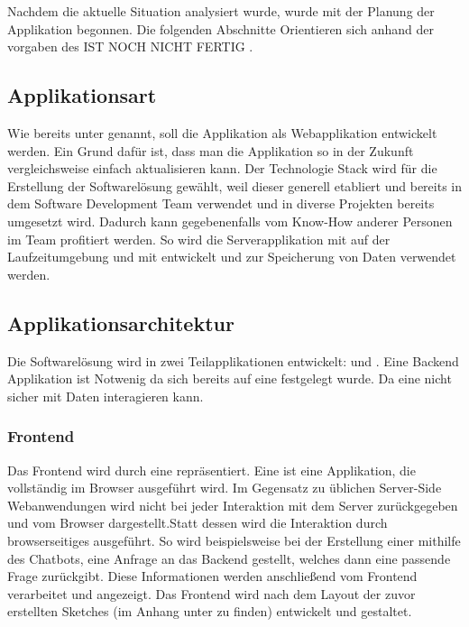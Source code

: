 Nachdem die aktuelle Situation analysiert wurde, wurde mit der Planung der Applikation begonnen. Die folgenden Abschnitte Orientieren sich anhand der vorgaben des \todo IST NOCH NICHT FERTIG .

\subsection{Applikationsart}

Wie bereits unter  genannt, soll die Applikation als Webapplikation entwickelt werden. Ein Grund dafür ist, dass man die Applikation so in der Zukunft
vergleichsweise einfach aktualisieren kann. Der Technologie Stack  wird für die Erstellung der Softwarelösung gewählt, weil dieser generell etabliert und bereits in dem Software Development Team verwendet und in diverse Projekten bereits umgesetzt wird. Dadurch kann gegebenenfalls vom Know-How anderer Personen im Team profitiert werden. So wird die Serverapplikation mit  auf der Laufzeitumgebung  und  mit  entwickelt und  zur Speicherung von Daten verwendet werden.

\subsection{Applikationsarchitektur}
\label{sec:Planungsphase:Applikationsarchitektur}

Die Softwarelösung wird in zwei Teilapplikationen entwickelt:  und . Eine Backend Applikation ist Notwenig da sich bereits auf eine  festgelegt wurde. Da eine  nicht sicher mit Daten interagieren kann.

\subsubsection{Frontend}
\label{sec:Planungsphase:Frontend}

Das Frontend wird durch eine  repräsentiert. Eine  ist eine Applikation, die vollständig im Browser ausgeführt wird.  Im Gegensatz zu üblichen Server-Side Webanwendungen wird nicht bei jeder Interaktion mit dem Server  zurückgegeben und vom Browser dargestellt.Statt dessen wird die Interaktion durch browserseitiges  ausgeführt. 
So wird beispielsweise bei der Erstellung einer  mithilfe des Chatbots, eine Anfrage an das Backend gestellt, welches dann eine passende Frage zurückgibt. Diese Informationen werden anschließend vom Frontend verarbeitet und angezeigt.
Das Frontend wird nach dem Layout der zuvor erstellten Sketches (im Anhang unter  zu finden) entwickelt und gestaltet. 

